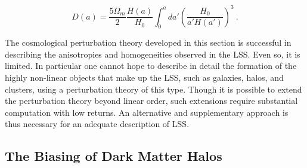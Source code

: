 \documentclass[10pt,letterpaper,final]{iopart}
\numberwithin{equation}{subsection}
\def\ni{\noindent}
\begin{document}
\begin{equation}\label{eq:growth_int}
D(a) = \frac{5\Omega_m}{2} \frac{H(a)}{H_0} \int_0^a da' \left(\frac{H_0}{a' H(a')}\right)^3 \ . 
\end{equation}

\ni The cosmological perturbation theory developed in this section is successful in describing the anisotropies and homogeneities observed in the LSS. Even so, it is limited. In particular one cannot hope to describe in detail the formation of the highly non-linear objects that make up the LSS, such as galaxies, halos, and clusters, using a perturbation theory of this type. Though it is possible to extend the perturbation theory beyond linear order, such extensions require substantial computation with low returns. An alternative and supplementary approach is thus necessary for an adequate description of LSS.  



%

\subsection{The Biasing of Dark Matter Halos}\label{sec:halobias}
\end{document}
